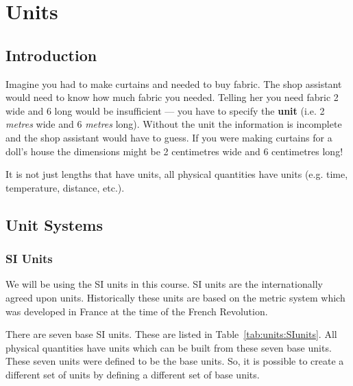 \documentclass[10pt,a4paper,titlepage,twoside,openright]{report}
\begin{document}
\clearpage
\tableofcontents
\cleardoublepage
{}


\chapter{Units}
\label{pd}

\section{Introduction}
Imagine you had to make curtains and needed to buy fabric. The
shop assistant would need to know how much fabric you needed.
Telling her you need fabric 2 wide and 6 long would be
insufficient --- you have to specify the {\bf unit} (i.e. 2 {\it
metres} wide and 6 {\it metres} long). Without the unit the
information is incomplete and the shop assistant would have to
guess. If you were making curtains for a doll's house the
dimensions might be 2 centimetres wide and 6 centimetres long!

It is not just lengths that have units, all physical quantities
have units (e.g. time, temperature, distance, etc.).


\section{Unit Systems}
\subsection{SI Units}
We will be using the SI units in this course. SI units are the
internationally agreed upon units. Historically these units are
based on the metric system which was developed in France at the
time of the French Revolution.


There are seven base SI units. These are listed in
Table~\ref{tab:units:SIunits}. All physical quantities have units
which can be built from these seven base units. These seven units
were defined to be the base units. So, it is possible to create a
different set of units by defining a different set of base units.
\end{document}
